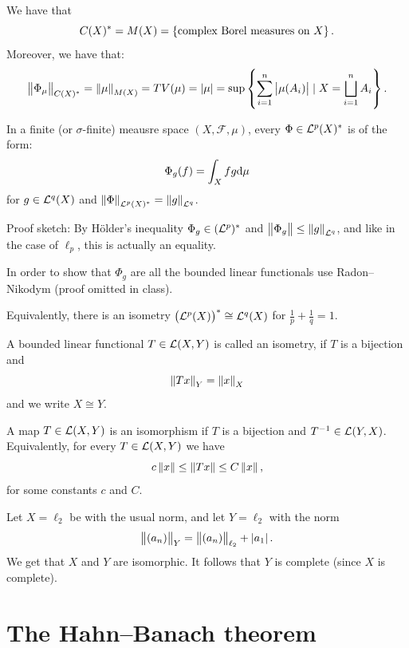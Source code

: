 \documentclass[11pt,a4paper]{article}
\begin{document}
\begin{theorem}
  We have that
  \[
    C(X)^* = M(X) = \left\{\text{complex Borel measures on $X$}\right\}.
  \]
  Moreover, we have that:
  \[
    \left\lVert\Phi_{\mu}\right\rVert_{C(X)^*} =
    \left\lVert\mu\right\rVert_{M(X)} = TV(\mu) = \left\lvert\mu\right\rvert =
    \sup\left\{\sum_{i=1}^{n} \left\lvert\mu(A_i)\right\rvert \mid X = \bigsqcup_{i=1}^{n} A_i\right\}.
  \]
\end{theorem}

\begin{example}
  In a finite (or $\sigma$-finite) meausre space $(X,\mathcal F, \mu)$,
  every $\Phi \in \mathcal{L}^p(X)^*$ is of the form:
  \[
    \Phi_g(f) =
    \int_X f g \mathrm{d} \mu
  \]
  for $g \in \mathcal{L}^q(X)$
  and $\left\lVert\Phi\right\rVert_{\mathcal{L}^p(X)^*} = \left\lVert g\right\rVert_{\mathcal{L}^q}$.

  Proof sketch:
  By H\"older's inequality $\Phi_g \in (\mathcal{L}^p)^*$
  and $\left\lVert\Phi_g\right\rVert \le \left\lVert g\right\rVert_{\mathcal{L}^q}$,
  and like in the case of $\ell_p$, this is actually an equality.

  In order to show that $\Phi_g$ are all the bounded linear functionals
  use Radon--Nikodym (proof omitted in class).

  Equivalently, there is an isometry $\del{\L^p(X)}^* \cong \L^q(X)$
  for $\frac{1}{p} + \frac{1}{q} = 1$.
\end{example}

\begin{definition}[Isometry]
  A bounded linear functional $T \in \mathcal{L}(X,Y)$ is called an isometry,
  if $T$ is a bijection and
  \[
    \left\lVert Tx\right\rVert_Y = \left\lVert x\right\rVert_X
  \]
  and we write $X \cong Y$.
\end{definition}

\begin{definition}[Isomorphism]
  A map $T \in \mathcal{L}(X,Y)$ is an isomorphism if $T$ is a bijection and
  $T^{-1} \in \mathcal{L}(Y,X)$.
  Equivalently, for every $T \in \mathcal{L}(X,Y)$ we have
  \[
    c\left\lVert x\right\rVert \le \left\lVert Tx\right\rVert \le C\left\lVert x\right\rVert,
  \]
  for some constants $c$ and $C$.
\end{definition}

\begin{example}
  Let $X = \ell_2$ be with the usual norm,
  and let $Y = \ell_2$ with the norm
  \[
    \left\lVert(a_n)\right\rVert_{Y} = \left\lVert(a_n)\right\rVert_{\ell_2} + \left\lvert a_1\right\rvert.
  \]
  We get that $X$ and $Y$ are isomorphic.
  It follows that $Y$ is complete (since $X$ is complete).
\end{example}

\section{The Hahn--Banach theorem}
\end{document}
